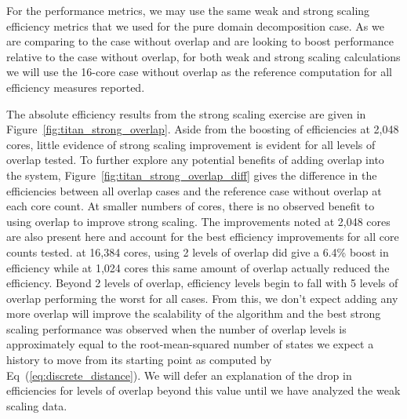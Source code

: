 For the performance metrics, we may use the same weak and strong
scaling efficiency metrics that we used for the pure domain
decomposition case. As we are comparing to the case without overlap
and are looking to boost performance relative to the case without
overlap, for both weak and strong scaling calculations we will use the
16-core case without overlap as the reference computation for all
efficiency measures reported. 

The absolute efficiency results from the strong scaling exercise are
given in Figure~\ref{fig:titan_strong_overlap}. Aside from the
boosting of efficiencies at 2,048 cores, little evidence of strong
scaling improvement is evident for all levels of overlap tested. To
further explore any potential benefits of adding overlap into the
system, Figure~\ref{fig:titan_strong_overlap_diff} gives the
difference in the efficiencies between all overlap cases and the
reference case without overlap at each core count. At smaller numbers
of cores, there is no observed benefit to using overlap to improve
strong scaling. The improvements noted at 2,048 cores are also present
here and account for the best efficiency improvements for all core
counts tested. at 16,384 cores, using 2 levels of overlap did give a
6.4\% boost in efficiency while at 1,024 cores this same amount of
overlap actually reduced the efficiency. Beyond 2 levels of overlap,
efficiency levels begin to fall with 5 levels of overlap performing
the worst for all cases. From this, we don't expect adding any more
overlap will improve the scalability of the algorithm and the best
strong scaling performance was observed when the number of overlap
levels is approximately equal to the root-mean-squared number of
states we expect a history to move from its starting point as computed
by Eq~(\ref{eq:discrete_distance}). We will defer an explanation of
the drop in efficiencies for levels of overlap beyond this value until
we have analyzed the weak scaling data.

